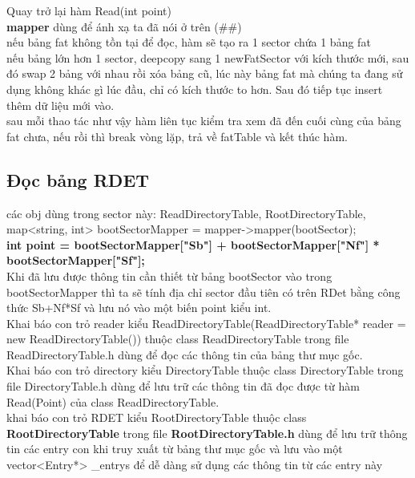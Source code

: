 Quay trở lại hàm Read(int point)\\
\textbf{ mapper} dùng để ánh xạ ta đã nói ở trên (\#\#)\\
nếu bảng fat không tồn tại để đọc, hàm sẽ tạo ra 1 sector chứa 1 bảng fat\\
nếu bảng lớn hơn 1 sector, deepcopy sang 1 newFatSector với kích thước mới, sau đó swap 2 bảng với nhau rồi xóa bảng cũ, lúc này bảng fat mà chúng ta đang sử dụng không khác gì lúc đầu, chỉ có kích thước to hơn. Sau đó tiếp tục insert thêm dữ liệu mới vào.\\
sau mỗi thao tác như vậy hàm liên tục kiểm tra xem đã đến cuối cùng của bảng fat chưa, nếu rồi thì break vòng lặp, trả về fatTable và kết thúc hàm.\\
\subsection{Đọc bảng RDET}
\noindent
các obj dùng trong sector này: ReadDirectoryTable, RootDirectoryTable, 
 map<string, int> bootSectorMapper = mapper->mapper(bootSector);\\
\textbf{ int point = bootSectorMapper["Sb"] + bootSectorMapper["Nf"] * bootSectorMapper["Sf"];}\\
\indent
Khi đã lưu được thông tin cần thiết từ bảng bootSector vào trong bootSectorMapper thì ta sẽ tính địa chỉ sector đầu tiên có trên RDet bằng công thức Sb+Nf*Sf và lưu nó vào một biến point kiểu int.\\
\indent
Khai báo con trỏ reader kiểu ReadDirectoryTable(ReadDirectoryTable* reader = new ReadDirectoryTable()) thuộc class ReadDirectoryTable trong file ReadDirectoryTable.h dùng để đọc các thông tin của bảng thư mục gốc. 	\\
\indent
Khai báo con trỏ directory kiểu DirectoryTable thuộc class DirectoryTable trong file DirectoryTable.h dùng để lưu trữ các thông tin đã đọc được từ hàm Read(Point) của class ReadDirectoryTable.\\
\indent
khai báo con trỏ RDET kiểu RootDirectoryTable thuộc class \textbf{RootDirectoryTable} trong file \textbf{RootDirectoryTable.h} dùng để lưu trữ thông tin các entry con khi truy xuất từ bảng thư mục gốc và lưu vào một vector<Entry*> \_entrys để dễ dàng sử dụng các thông tin từ các entry này\\
